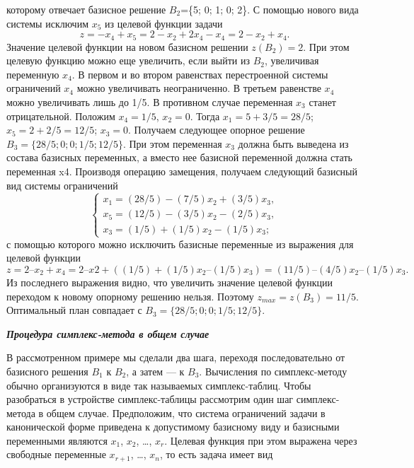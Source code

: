 \documentclass{article}
\begin{document}
которому отвечает базисное решение $B_2$=\{5; 0; 1; 0; 2\}. С помощью нового вида системы исключим $x_5$ из целевой функции задачи 
$$z = -x_4 + x_5 = 2 - x_2 + 2x_4 - x_4 = 2 - x_2 + x_4.$$
Значение целевой функции на новом базисном решении $z(B_2) = 2$. При этом целевую функцию можно еще увеличить, если выйти из $B_2$, увеличивая переменную $x_4$. В первом и во втором равенствах перестроенной системы ограничений $x_4$ можно увеличивать неограниченно. В третьем равенстве $x_4$ можно увеличивать лишь до 1/5. В противном случае переменная $x_3$ станет отрицательной. Положим $x_4 = 1/5$, $x_2 = 0$. Тогда $x_1 = 5 + 3/5 = 28/5$; $x_5 = 2 + 2 / 5 = 12 / 5$; $x_3 = 0$. Получаем следующее опорное решение $B_3=\{28/5; 0; 0; 1/5; 12/5\}$. При этом переменная $x_3$ должна быть выведена из состава базисных переменных, а вместо нее базисной переменной должна стать переменная x4. Производя операцию замещения, получаем следующий базисный вид системы ограничений
\begin{equation*}
\begin{cases}
x_1 = (28/5) - (7/5)x_2 + (3/5)x_3,\\
x_5 = (12/5) - (3/5)x_2 - (2/5)x_3,\\
x_3 = (1/5) + (1/5)x_2 - (1/5)x_3;
\end{cases}
\end{equation*}
с помощью которого можно исключить базисные переменные из выражения для целевой функции
$$z = 2 – x_2 + x_4 = 2 – x2 + ((1/5) + (1/5)x_2 – (1/5)x_3) = (11/5) – (4/5)x_2 – (1/5)x_3.$$
Из последнего выражения видно, что увеличить значение целевой функции переходом к новому опорному решению нельзя. Поэтому $z_{max}= z(B_3) = 11/5$. Оптимальный план совпадает с $B_3 = \{28/5; 0; 0; 1/5; 12/5\}$.
\begin{center}
\textit{\textbf{Процедура симплекс-метода в общем случае}}
\end{center}

В рассмотренном примере мы сделали два шага, переходя последовательно от базисного решения $B_1$ к $B_2$, а затем — к $B_3$. Вычисления по симплекс-методу обычно организуются в виде так называемых симплекс-таблиц. Чтобы разобраться в устройстве симплекс-таблицы рассмотрим один шаг симплекс-метода в общем случае. Предположим, что система ограничений задачи в канонической форме приведена к допустимому базисному виду и базисными переменными являются $x_1$, $x_2$, \dots, $x_r$. Целевая функция при этом выражена через свободные переменные $x_{r+1}$, \dots, $x_n$, то есть задача имеет вид
\end{document}
